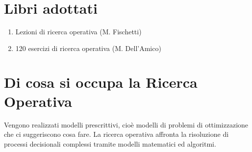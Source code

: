 \documentclass[\main/main.tex]{subfiles}
\begin{document}
\section{Libri adottati}

\begin{enumerate} 
\item Lezioni di ricerca operativa (M. Fischetti)
\item 120 esercizi di ricerca operativa (M. Dell'Amico)
\end{enumerate}

\section{Di cosa si occupa la Ricerca Operativa}
Vengono realizzati modelli prescrittivi, cioè modelli di problemi di ottimizzazione che ci suggeriscono cosa fare. La ricerca operativa affronta la risoluzione di processi decisionali complessi tramite modelli matematici ed algoritmi.
\end{document}
